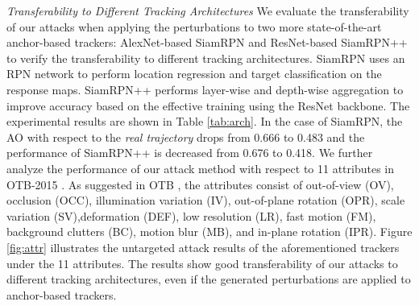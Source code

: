 \documentclass[journal]{IEEEtran}
\begin{document}
\textit{Transferability to Different Tracking Architectures} We evaluate the transferability of our attacks when applying the perturbations to two more state-of-the-art anchor-based trackers: AlexNet-based SiamRPN \cite{SiamRPN} and ResNet-based SiamRPN++ \cite{SiamRPN++} to verify the transferability to different tracking architectures.
SiamRPN uses an RPN network to perform location regression and target classification on the response maps. SiamRPN++ performs layer-wise and depth-wise aggregation to improve accuracy based on the effective training using the ResNet backbone. The experimental results are shown in Table \ref{tab:arch}. In the case of SiamRPN, the AO with respect to the \textit{real trajectory} drops from 0.666 to 0.483 and the performance of SiamRPN++ is decreased from 0.676 to 0.418. We further analyze the performance of our attack method with respect to 11 attributes in OTB-2015 \cite{OTB}. As suggested in OTB \cite{OTB}, the attributes consist of out-of-view (OV), occlusion (OCC), illumination variation (IV), out-of-plane rotation (OPR), scale variation (SV),deformation (DEF), low resolution (LR), fast motion (FM), background clutters (BC), motion blur (MB), and in-plane rotation (IPR). Figure \ref{fig:attr} illustrates the untargeted attack results of the aforementioned trackers under the 11 attributes. The results show good transferability of our attacks to different tracking architectures, even if the generated perturbations are applied to anchor-based trackers.
\end{document}
